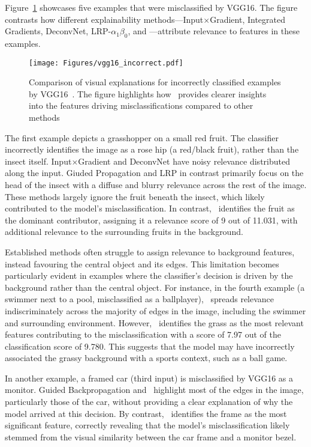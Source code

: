 Figure~\ref{Fig:vgg16_incorrect} showcases five examples that were misclassified by VGG16. The figure contrasts how different explainability methods—Input$\times$Gradient, Integrated Gradients, DeconvNet, LRP-$\alpha_1\beta_0$, and \CTC—attribute relevance to features in these examples.

\begin{figure}[ht!] 
\begin{center} 
\texttt{[image: Figures/vgg16\_incorrect.pdf]} \end{center} 
\caption{Comparison of visual explanations for incorrectly classified examples by VGG16~\cite{SimonyanZ14a}. The figure highlights how \CTC\ provides clearer insights into the features driving misclassifications compared to other methods} 
\label{Fig:vgg16_incorrect}
\end{figure}

The first example depicts a grasshopper on a small red fruit. The classifier incorrectly identifies the image as a rose hip (a red/black fruit), rather than the insect itself.  Input$\times$Gradient and DeconvNet have noisy relevance distributed along the input. Giuded Propagation and LRP in contrast primarily focus on the head of the insect with a diffuse and blurry relevance across the rest of the image. These methods largely ignore the fruit beneath the insect, which likely contributed to the model’s misclassification. In contrast, \CTC\ identifies the fruit as the dominant contributor, assigning it a relevance score of 9 out of 11.031, with additional relevance to the surrounding fruits in the background.

Established methods often struggle to assign relevance to background features, instead favouring the central object and its edges. This limitation becomes particularly evident in examples where the classifier's decision is driven by the background rather than the central object. For instance, in the fourth example (a swimmer next to a pool, misclassified as a ballplayer), \LRP\ spreads relevance indiscriminately across the majority of edges in the image, including the swimmer and surrounding environment. However, \CTC\ identifies the grass as the most relevant features contributing to the misclassification with a score of 7.97 out of the classification score of 9.780. This suggests that the model may have incorrectly associated the grassy background with a sports context, such as a ball game.

In another example, a framed car (third input) is misclassified by VGG16 as a monitor. Guided Backpropagation and \LRP\ highlight most of the edges in the image, particularly those of the car, without providing a clear explanation of why the model arrived at this decision. By contrast, \CTC\ identifies the frame as the most significant feature, correctly revealing that the model's misclassification likely stemmed from the visual similarity between the car frame and a monitor bezel.

